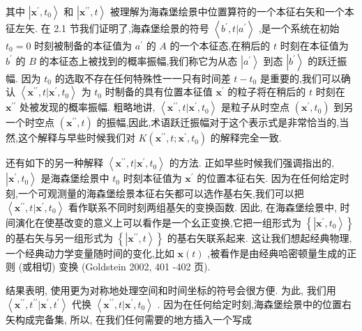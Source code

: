 \documentclass[lang=cn,newtx,10pt,scheme=chinese,thmcnt=section]{elegantbook}
\begin{document}
其中 $\left| {{\mathbf{x}}^{\prime },{t}_{0}}\right\rangle$ 和 $\left| {{\mathbf{x}}^{\prime \prime }, t}\right\rangle$ 被理解为海森堡绘景中位置算符的一个本征右矢和一个本征左矢. 在 2.1 节我们证明了,海森堡绘景的符号 $\left\langle {{b}^{\prime }, t | {a}^{\prime }}\right\rangle$ ,是一个系统在初始 ${t}_{0} = 0$ 时刻被制备的本征值为 ${a}^{\prime }$ 的 $A$ 的一个本征态,在稍后的 $t$ 时刻在本征值为 ${b}^{\prime }$ 的 $B$ 的本征态上被找到的概率振幅,我们称它为从态 $\left| {a}^{\prime }\right\rangle$ 到态 $\left| {b}^{\prime }\right\rangle$ 的跃迁振幅. 因为 ${t}_{0}$ 的选取不存在任何特殊性一一只有时间差 $t - {t}_{0}$ 是重要的,我们可以确认 $\left\langle {{\mathbf{x}}^{\prime \prime }, t | {\mathbf{x}}^{\prime },{t}_{0}}\right\rangle$ 为 ${t}_{0}$ 时制备的具有位置本征值 ${\mathbf{x}}^{\prime }$ 的粒子将在稍后的 $t$ 时刻在 ${\mathbf{x}}^{\prime \prime }$ 处被发现的概率振幅. 粗略地讲, $\left\langle {{\mathbf{x}}^{\prime \prime }, t | {\mathbf{x}}^{\prime },{t}_{0}}\right\rangle$ 是粒子从时空点 $\left( {{\mathbf{x}}^{\prime },{t}_{0}}\right)$ 到另一个时空点 $\left( {{\mathbf{x}}^{\prime \prime }, t}\right)$ 的振幅,因此,术语跃迁振幅对于这个表示式是非常恰当的,当然,这个解释与早些时候我们对 $K\left( {{\mathbf{x}}^{\prime \prime }, t;{\mathbf{x}}^{\prime },{t}_{0}}\right)$ 的解释完全一致.

还有如下的另一种解释 $\left\langle {{\mathbf{x}}^{\prime \prime }, t | {\mathbf{x}}^{\prime },{t}_{0}}\right\rangle$ 的方法. 正如早些时候我们强调指出的, $\left| {{\mathbf{x}}^{\prime },{t}_{0}}\right\rangle$ 是海森堡绘景中 ${t}_{0}$ 时刻本征值为 ${\mathbf{x}}^{\prime }$ 的位置本征右矢. 因为在任何给定时刻,一个可观测量的海森堡绘景本征右矢都可以选作基右矢,我们可以把 $\left\langle {{\mathbf{x}}^{\prime \prime }, t | {\mathbf{x}}^{\prime },{t}_{0}}\right\rangle$ 看作联系不同时刻两组基矢的变换函数. 因此, 在海森堡绘景中, 时间演化在使基改变的意义上可以看作是一个幺正变换,它把一组形式为 $\left\{ \left| {{\mathbf{x}}^{\prime },{t}_{0}}\right\rangle \right\}$ 的基右矢与另一组形式为 $\left\{ \left| {{\mathbf{x}}^{\prime \prime }, t}\right\rangle \right\}$ 的基右矢联系起来. 这让我们想起经典物理,一个经典动力学变量随时间的变化,比如 $\mathbf{x}\left( t\right)$ ,被看作是由经典哈密顿量生成的正则 (或相切) 变换 (Goldstein 2002, 401 -402 页).

结果表明, 使用更为对称地处理空间和时间坐标的符号会很方便. 为此, 我们用 $\left\langle {{\mathbf{x}}^{\prime \prime },{t}^{\prime \prime } | {\mathbf{x}}^{\prime },{t}^{\prime }}\right\rangle$ 代换 $\left\langle {{\mathbf{x}}^{\prime \prime }, t | {\mathbf{x}}^{\prime },{t}_{0}}\right\rangle$ . 因为在任何给定时刻,海森堡绘景中的位置右矢构成完备集, 所以, 在我们任何需要的地方插入一个写成
\end{document}
